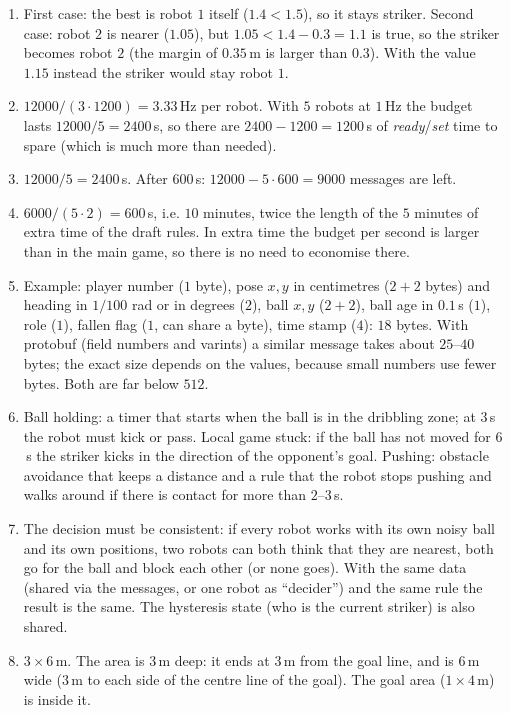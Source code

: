 \begin{enumerate}[label=\textbf{\ansnum.\arabic*}]
  \item First case: the best is robot $1$ itself ($1.4<1.5$), so it stays striker. Second case: robot $2$ is nearer ($1.05$), but $1.05<1.4-0.3=1.1$ is true, so the striker becomes robot $2$ (the margin of $0.35$\,m is larger than $0.3$). With the value $1.15$ instead the striker would stay robot $1$.
  \item $12000/(3\cdot1200)=3.33$\,Hz per robot. With $5$ robots at $1$\,Hz the budget lasts $12000/5=2400$\,s, so there are $2400-1200=1200$\,s of \emph{ready}/\emph{set} time to spare (which is much more than needed).
  \item $12000/5=2400$\,s. After $600$\,s: $12000-5\cdot600=9000$ messages are left.
  \item $6000/(5\cdot2)=600$\,s, i.e. $10$ minutes, twice the length of the $5$ minutes of extra time of the draft rules. In extra time the budget per second is larger than in the main game, so there is no need to economise there.
  \item Example: player number ($1$ byte), pose $x,y$ in centimetres ($2+2$ bytes) and heading in $1/100$ rad or in degrees ($2$), ball $x,y$ ($2+2$), ball age in $0.1$\,s ($1$), role ($1$), fallen flag ($1$, can share a byte), time stamp ($4$): $18$ bytes. With protobuf (field numbers and varints) a similar message takes about $25$--$40$ bytes; the exact size depends on the values, because small numbers use fewer bytes. Both are far below $512$.
  \item Ball holding: a timer that starts when the ball is in the dribbling zone; at $3$\,s the robot must kick or pass. Local game stuck: if the ball has not moved for $6$\,s the striker kicks in the direction of the opponent's goal. Pushing: obstacle avoidance that keeps a distance and a rule that the robot stops pushing and walks around if there is contact for more than $2$--$3$\,s.
  \item The decision must be consistent: if every robot works with its own noisy ball and its own positions, two robots can both think that they are nearest, both go for the ball and block each other (or none goes). With the same data (shared via the messages, or one robot as ``decider'') and the same rule the result is the same. The hysteresis state (who is the current striker) is also shared.
  \item $3\times6$\,m. The area is $3$\,m deep: it ends at $3$\,m from the goal line, and is $6$\,m wide ($3$\,m to each side of the centre line of the goal). The goal area ($1\times4$\,m) is inside it.

\end{enumerate}
